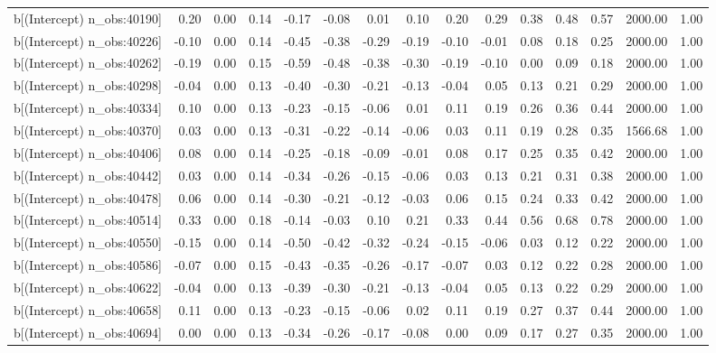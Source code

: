 \begin{table}[ht]
\begin{tabular}{rrrrrrrrrrrrrrr}
  b[(Intercept) n\_obs:40190] & 0.20 & 0.00 & 0.14 & -0.17 & -0.08 & 0.01 & 0.10 & 0.20 & 0.29 & 0.38 & 0.48 & 0.57 & 2000.00 & 1.00 \\ 
  b[(Intercept) n\_obs:40226] & -0.10 & 0.00 & 0.14 & -0.45 & -0.38 & -0.29 & -0.19 & -0.10 & -0.01 & 0.08 & 0.18 & 0.25 & 2000.00 & 1.00 \\ 
  b[(Intercept) n\_obs:40262] & -0.19 & 0.00 & 0.15 & -0.59 & -0.48 & -0.38 & -0.30 & -0.19 & -0.10 & 0.00 & 0.09 & 0.18 & 2000.00 & 1.00 \\ 
  b[(Intercept) n\_obs:40298] & -0.04 & 0.00 & 0.13 & -0.40 & -0.30 & -0.21 & -0.13 & -0.04 & 0.05 & 0.13 & 0.21 & 0.29 & 2000.00 & 1.00 \\ 
  b[(Intercept) n\_obs:40334] & 0.10 & 0.00 & 0.13 & -0.23 & -0.15 & -0.06 & 0.01 & 0.11 & 0.19 & 0.26 & 0.36 & 0.44 & 2000.00 & 1.00 \\ 
  b[(Intercept) n\_obs:40370] & 0.03 & 0.00 & 0.13 & -0.31 & -0.22 & -0.14 & -0.06 & 0.03 & 0.11 & 0.19 & 0.28 & 0.35 & 1566.68 & 1.00 \\ 
  b[(Intercept) n\_obs:40406] & 0.08 & 0.00 & 0.14 & -0.25 & -0.18 & -0.09 & -0.01 & 0.08 & 0.17 & 0.25 & 0.35 & 0.42 & 2000.00 & 1.00 \\ 
  b[(Intercept) n\_obs:40442] & 0.03 & 0.00 & 0.14 & -0.34 & -0.26 & -0.15 & -0.06 & 0.03 & 0.13 & 0.21 & 0.31 & 0.38 & 2000.00 & 1.00 \\ 
  b[(Intercept) n\_obs:40478] & 0.06 & 0.00 & 0.14 & -0.30 & -0.21 & -0.12 & -0.03 & 0.06 & 0.15 & 0.24 & 0.33 & 0.42 & 2000.00 & 1.00 \\ 
  b[(Intercept) n\_obs:40514] & 0.33 & 0.00 & 0.18 & -0.14 & -0.03 & 0.10 & 0.21 & 0.33 & 0.44 & 0.56 & 0.68 & 0.78 & 2000.00 & 1.00 \\ 
  b[(Intercept) n\_obs:40550] & -0.15 & 0.00 & 0.14 & -0.50 & -0.42 & -0.32 & -0.24 & -0.15 & -0.06 & 0.03 & 0.12 & 0.22 & 2000.00 & 1.00 \\ 
  b[(Intercept) n\_obs:40586] & -0.07 & 0.00 & 0.15 & -0.43 & -0.35 & -0.26 & -0.17 & -0.07 & 0.03 & 0.12 & 0.22 & 0.28 & 2000.00 & 1.00 \\ 
  b[(Intercept) n\_obs:40622] & -0.04 & 0.00 & 0.13 & -0.39 & -0.30 & -0.21 & -0.13 & -0.04 & 0.05 & 0.13 & 0.22 & 0.29 & 2000.00 & 1.00 \\ 
  b[(Intercept) n\_obs:40658] & 0.11 & 0.00 & 0.13 & -0.23 & -0.15 & -0.06 & 0.02 & 0.11 & 0.19 & 0.27 & 0.37 & 0.44 & 2000.00 & 1.00 \\ 
  b[(Intercept) n\_obs:40694] & 0.00 & 0.00 & 0.13 & -0.34 & -0.26 & -0.17 & -0.08 & 0.00 & 0.09 & 0.17 & 0.27 & 0.35 & 2000.00 & 1.00 \\ 

\end{tabular}
\end{table}
